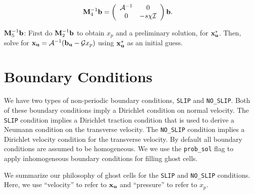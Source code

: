 \documentclass[final]{siamltex}
\def\bb {{\bf b}}
\def\Mb {{\bf M}}
\def\ub {{\bf u}}
\def\xb {{\bf x}}
\begin{document}
\begin{equation}
\Mb^{-1}_4\bb =
\left(\begin{array}{cc}
\mathcal{A}^{-1} & 0\\
0 & -s\chi \mathcal{I} 
\end{array}\right)
\bb.
\end{equation}

$\Mb^{-1}_5\bb$: First do $\Mb^{-1}_2\bb$ to obtain $x_p$ and a preliminary solution,
for $\xb_{\ub}^*$.  Then, solve for $\xb_{\ub} = \mathcal{A}^{-1}(\bb_{\ub} - \mathcal{G}x_p)$
using $\xb_{\ub}^*$ as an initial guess.

\section{Boundary Conditions}

We have two types of non-periodic boundary conditions, {\tt SLIP} and {\tt NO\_SLIP}.
Both of these boundary conditions imply a Dirichlet condition on normal velocity.
The {\tt SLIP} condition implies a Dirichlet traction condition that
is used to derive a Neumann condition on the transverse velocity.
The {\tt NO\_SLIP} condition implies a Dirichlet velocity condition for the
transverse velocity.  By default all boundary conditions are assumed to be homogeneous.
We we use the {\tt prob\_sol} flag to apply inhomogeneous boundary conditions for
filling ghost cells.

We summarize our philosophy of ghost cells for the {\tt SLIP} and {\tt NO\_SLIP}
conditions.  Here, we use ``velocity'' to refer to $\xb_{\ub}$ and ``pressure'' to refer
to $x_p$.
\end{document}
